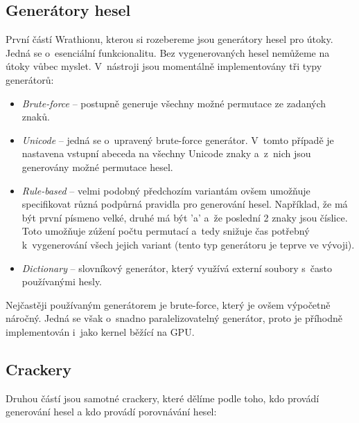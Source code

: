 \subsection{Generátory hesel}
První částí Wrathionu, kterou si rozebereme jsou generátory hesel pro útoky. Jedná se o~esenciální
funkcionalitu. Bez vygenerovaných hesel nemůžeme na útoky vůbec myslet. V~nástroji jsou momentálně
implementovány tři typy generátorů:
\begin{itemize}
    \item {\it Brute-force} -- postupně generuje všechny možné permutace ze zadaných znaků.
    \item {\it Unicode} -- jedná se o~upravený brute-force generátor. V~tomto případě je nastavena
	vstupní abeceda na všechny Unicode znaky a~z~nich jsou generovány možné permutace hesel.
    \item {\it Rule-based} -- velmi podobný předchozím variantám ovšem umožňuje specifikovat různá
	podpůrná pravidla pro generování hesel. Například, že má být první písmeno velké, druhé má
	být 'a' a~že poslední 2 znaky jsou číslice. Toto umožňuje zúžení počtu permutací a~tedy
	snižuje čas potřebný k~vygenerování všech jejich variant (tento typ generátoru je teprve
	ve vývoji).
    \item {\it Dictionary} -- slovníkový generátor, který využívá externí soubory s~často
	používanými hesly.
\end{itemize}
Nejčastěji používaným generátorem je brute-force, který je ovšem výpočetně náročný. Jedná se
však o~snadno paralelizovatelný generátor, proto je příhodně implementován i~jako kernel běžící na
GPU.
\subsection{Crackery}
Druhou částí jsou samotné crackery, které dělíme podle toho, kdo provádí generování hesel a
kdo provádí porovnávání hesel:
